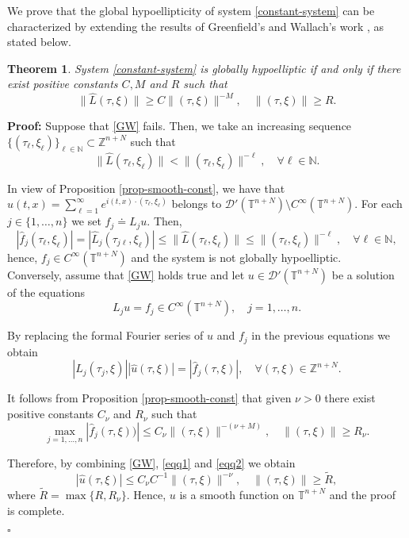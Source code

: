 \documentclass[12pt]{elsarticle}
\newtheorem{theorem}{Theorem}[section]
\numberwithin{equation}{section}
\newenvironment{proof}[1][\noindent \textbf{Proof: }]{#1}{ \hfill $\square$ \vspace{2mm}}
\begin{document}
We prove that  the global hypoellipticity of  system \eqref{constant-system} can be cha\-racte\-rized
by extending  the results of Greenfield's and Wallach's work \cite{GW1}, as stated below.

\begin{theorem}\label{general-constant-system}
System \eqref{constant-system} is globally hypoelliptic if and only if there exist positive constants $C,M$ and $R$ such that
\begin{equation}\label{GW}
\|\widehat{L}(\tau, \xi)\| \geq C \|(\tau, \xi)\|^{-M}, \quad  \|(\tau, \xi)\| \geq R.
\end{equation}
\end{theorem}

\begin{proof}
Suppose that \eqref{GW} fails. Then, we take an increasing sequence $\{(\tau_{\ell}, \xi_{\ell})\}_{\ell \in \mathbb{N}} \subset \mathbb{Z}^{n+N}$ such that
$$
\|\widehat{L}(\tau_{\ell},\xi_{\ell})\|< \|(\tau_{\ell},\xi_{\ell})\|^{-\ell}, \quad \forall \ell \in \mathbb{N}.
$$	

In view of Proposition \ref{prop-smooth-const}, we have that 
$
u(t,x)=\sum_{\ell=1}^{\infty} e^{i (t,x)\cdot (\tau_{\ell},\xi_{\ell})}
$ belongs to $\mathcal{D}'(\mathbb{T}^{n+N})\setminus C^{\infty}(\mathbb{T}^{n+N})$. For each $j \in \{1, \ldots, n\}$ we set  $f_j \doteq L_j u$. Then, 
$$
|\widehat{f}_j(\tau_{\ell},\xi_{\ell})|=|\widehat{L}_j(\tau_{j\ell},\xi_{\ell}) | \leq \|\widehat{L}(\tau_{\ell},\xi_{\ell})\|\leq \|(\tau_{\ell},\xi_{\ell})\|^{-\ell}, \quad \forall \ell \in \mathbb{N},
$$
hence, $f_j \in C^{\infty}(\mathbb{T}^{n+N})$ and the system is not globally hypoelliptic. \\

Conversely, assume that \eqref{GW} holds true and let $u\in\mathcal{D}'(\mathbb{T}^{n+N})$ be a solution of the equations
$$
L_j u  = f_j \in  C^{\infty}(\mathbb{T}^{n+N}), \quad j=1, \ldots, n.
$$

By replacing the formal Fourier series of $u$ and $f_j$ in the previous equations we obtain
\begin{equation}\label{eqq1}
|\widehat{L}_j(\tau_j,\xi)| |\widehat{u}(\tau,\xi)| = |\widehat{f}_j(\tau,\xi)|, \quad \forall (\tau,\xi) \in \mathbb{Z}^{n+N}.
\end{equation}


It follows from Proposition \ref{prop-smooth-const} that given $\nu>0$ there exist positive constants $C_\nu$ and $R_\nu$ such that 
\begin{equation}\label{eqq2}
\max_{j=1,\ldots,n} |\widehat{f}_j(\tau,\xi))|\leq C_\nu  \|(\tau,\xi)\|^{-(\nu+M)}, \quad \|(\tau,\xi)\|\geq R_\nu. 
\end{equation}

Therefore, by combining \eqref{GW}, \eqref{eqq1} and \eqref{eqq2} we obtain
$$
|\widehat{u}(\tau,\xi)| \leq C_{\nu} C^{-1} \|(\tau,\xi)\|^{-\nu}, \quad \|(\tau,\xi)\| \geq \widetilde{R},
$$
where $\widetilde{R} = \max\{R, R_{\nu}\}$. Hence, $u$ is a smooth function on $\mathbb{T}^{n+N}$ and the proof is complete.

\end{proof}
\end{document}
